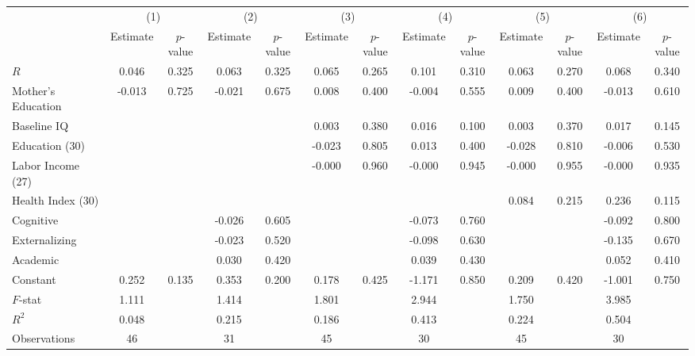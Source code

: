 \begin{tabular}{lcccccccccccc} \toprule
 & \multicolumn{2}{c}{(1)}  &  \multicolumn{2}{c}{(2)}  &  \multicolumn{2}{c}{(3)}  &  \multicolumn{2}{c}{(4)}  & \multicolumn{2}{c}{(5)} & \multicolumn{2}{c}{(6)} \\  
 & Estimate & $p$-value & Estimate & $p$-value & Estimate & $p$-value & Estimate & $p$-value & Estimate & $p$-value & Estimate & $p$-value \\ \midrule
$R$ &     0.046 &     0.325 &     0.063 &     0.325 &     0.065 &     0.265 &     0.101 &     0.310 &     0.063 &     0.270 &     0.068 &     0.340 \\  
Mother's Education &    -0.013 &     0.725 &    -0.021 &     0.675 &     0.008 &     0.400 &    -0.004 &     0.555 &     0.009 &     0.400 &    -0.013 &     0.610 \\  
Baseline IQ &          &         &         &         &     0.003 &     0.380 &     0.016 &     0.100 &     0.003 &     0.370 &     0.017 &     0.145 \\  
Education (30) &          &         &         &         &    -0.023 &     0.805 &     0.013 &     0.400 &    -0.028 &     0.810 &    -0.006 &     0.530 \\  
Labor Income (27) &         &         &         &         &    -0.000 &     0.960 &    -0.000 &     0.945 &    -0.000 &     0.955 &    -0.000 &     0.935 \\  
Health Index (30) &         &         &         &         &         &         &         &         &     0.084 &     0.215 &     0.236 &     0.115 \\  
Cognitive &         &         &    -0.026 &     0.605 &         &         &    -0.073 &     0.760 &         &         &    -0.092 &     0.800 \\  
Externalizing &         &         &    -0.023 &     0.520 &         &         &    -0.098 &     0.630 &         &         &    -0.135 &     0.670 \\  
Academic &         &         &     0.030 &     0.420 &         &         &     0.039 &     0.430 &         &         &     0.052 &     0.410 \\  
Constant &     0.252 &     0.135 &     0.353 &     0.200 &     0.178 &     0.425 &    -1.171 &     0.850 &     0.209 &     0.420 &    -1.001 &     0.750 \\  \midrule
$F$-stat &     1.111 &         &     1.414 &         &     1.801 &         &     2.944 &         &     1.750 &         &     3.985 &         \\  
$R^2$ &     0.048 &         &     0.215 &         &     0.186 &         &     0.413 &         &     0.224 &         &     0.504 &         \\  
Observations &    46 &         &    31&         &    45 &         &    30 &         &    45 &         &    30 &         \\  
\bottomrule \end{tabular}

